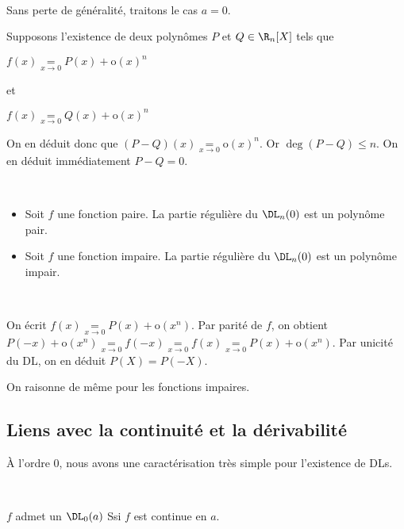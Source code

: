 \documentclass[12pt]{article}
\begin{document}
\begin{demo}~

Sans perte de généralité, traitons le cas $a=0$.

Supposons l'existence de deux polynômes $P$ et $Q \in \R_n[X]$ tels que 

$f(x)\underset{x\rightarrow 0}{=} P(x) + \text{o}(x)^{n}$

et 

$f(x)\underset{x\rightarrow 0}{=} Q(x) + \text{o}(x)^{n}$

On en déduit donc que $(P-Q) (x) \underset{x\rightarrow 0}{=} \text{o}(x)^{n}$. Or $\deg(P-Q)\leq n$. On
en déduit immédiatement $P-Q=0$.

\end{demo}


\begin{Cor}~


\begin{itemize}
\item Soit $f$ une fonction paire. La partie régulière du $\DL_n(0)$ est un
polynôme pair.

\item Soit $f$ une fonction impaire. La partie régulière du $\DL_n(0)$ est un
polynôme impair.
\end{itemize}

\end{Cor}

\begin{demo}~

On écrit $f(x)\underset{x\rightarrow 0}{=}P(x)+\text{o}(x^n)$. Par parité de $f$, on obtient
$P(-x)+\text{o}(x^n)\underset{x\rightarrow 0}{=}f(-x)\underset{x\rightarrow 0}{=}f(x)\underset{x\rightarrow 0}{=}P(x)+\text{o}(x^n)$. Par unicité du DL, on
en déduit $P(X)=P(-X)$.

On raisonne de même pour les fonctions impaires.

\end{demo}

\subsection{Liens avec la continuité et la dérivabilité}

À l'ordre 0, nous avons une caractérisation très simple pour l'existence de
DLs. 

\begin{Prop}~

$f$ admet un $\DL_0(a)$ Ssi $f$ est continue en $a$.

\end{Prop}
\end{document}
